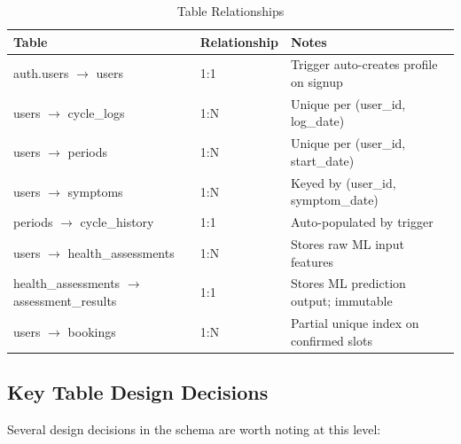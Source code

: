 \begin{table}[h!]
\centering
\caption{Table Relationships}
\label{tab:er}
\renewcommand{\arraystretch}{1.4}
\begin{tabular}{|p{3.5cm}|p{2.5cm}|p{6.5cm}|}
\hline
\rowcolor[HTML]{D9D9D9}
\textbf{Table} & \textbf{Relationship} & \textbf{Notes} \\
\hline
auth.users $\rightarrow$ users & 1:1 & Trigger auto-creates profile on signup \\
\hline
users $\rightarrow$ cycle\_logs & 1:N & Unique per (user\_id, log\_date) \\
\hline
users $\rightarrow$ periods & 1:N & Unique per (user\_id, start\_date) \\
\hline
users $\rightarrow$ symptoms & 1:N & Keyed by (user\_id, symptom\_date) \\
\hline
periods $\rightarrow$ cycle\_history & 1:1 & Auto-populated by trigger \\
\hline
users $\rightarrow$ health\_assessments & 1:N & Stores raw ML input features \\
\hline
health\_assessments $\rightarrow$ assessment\_results & 1:1 & Stores ML prediction output; immutable \\
\hline
users $\rightarrow$ bookings & 1:N & Partial unique index on confirmed slots \\
\hline
\end{tabular}
\end{table}

\subsection{Key Table Design Decisions}
\label{subsec:table-design}

Several design decisions in the schema are worth noting at this level:

